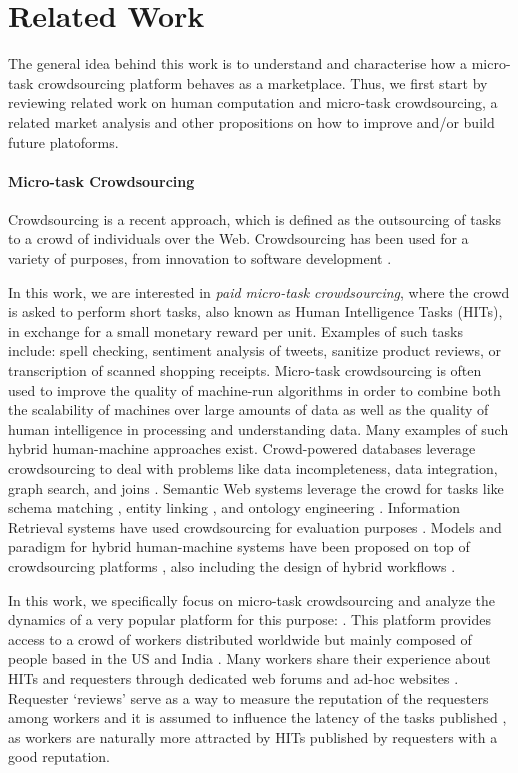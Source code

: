 \section{Related Work}\label{sec:relwork}

The general idea behind this work is to understand and characterise how a micro-task crowdsourcing platform behaves as a marketplace. Thus, we first start by reviewing related work on human computation and micro-task crowdsourcing, a related market analysis and other propositions on how to improve and/or build future platoforms.


\paragraph{Micro-task Crowdsourcing}
Crowdsourcing is a recent approach, which is defined as the outsourcing of tasks  to a crowd of individuals over the Web. Crowdsourcing has been used for a variety of purposes, from innovation to software development \cite{platforms}. 

In this work, we are interested in \emph{paid micro-task crowdsourcing}, where the crowd is asked to perform short tasks, also known as Human Intelligence Tasks (HITs), in exchange for a small monetary reward per unit. Examples of such tasks include: spell checking, sentiment analysis of tweets, sanitize product reviews, or transcription of scanned shopping receipts.
% 
Micro-task crowdsourcing is often used to improve the quality of machine-run algorithms in order to combine both the scalability of machines over large amounts of data as well as the quality of human intelligence in processing and understanding data. Many examples of such hybrid human-machine approaches exist.
% 
Crowd-powered databases \cite{crowddb} leverage crowdsourcing to deal with problems like  data incompleteness,  data integration, graph search, and joins \cite{crowder,graphsearch,crowdjoins}.
% 
Semantic Web systems leverage the crowd for tasks like schema matching \cite{crowdmap}, entity linking \cite{zencrowd}, and ontology engineering \cite{bioonto}.
% 
Information Retrieval systems have used crowdsourcing for evaluation purposes \cite{mizzaroalonso}.
% 
Models and paradigm for hybrid human-machine systems have been proposed on top of crowdsourcing platforms \cite{crowdcomputer}, also including the design of hybrid workflows \cite{workflows}.

In this work, we specifically focus on micro-task crowdsourcing and analyze the dynamics of a  very popular  platform for this purpose: \amt{}. This platform provides access to a crowd of workers distributed worldwide but mainly composed of people based in the US and India \cite{mturk}. Many \amt{} workers share their experience about HITs and requesters through dedicated web forums and ad-hoc websites \cite{turkopticon}. Requester `reviews' serve as a way to measure the reputation of the requesters among workers and it is assumed to influence the latency of the tasks published \cite{TOreputation}, as workers are naturally more attracted by HITs published by  requesters with a good reputation.


